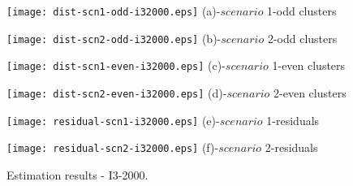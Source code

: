 \begin{figure}
     \begin{minipage}[h]{0.5\linewidth}
        \centering
        \texttt{[image: dist-scn1-odd-i32000.eps]}
				\footnotesize{(a)-$scenario$ 1-odd clusters}
     \end{minipage}
\vspace{3.00mm}
    \begin{minipage}[h]{0.5\linewidth}
       \centering
       \texttt{[image: dist-scn2-odd-i32000.eps]}
			\footnotesize{(b)-$scenario$ 2-odd clusters}
     \end{minipage}
\vspace{3.00mm}
    \begin{minipage}[h]{0.5\linewidth}
       \centering
       \texttt{[image: dist-scn1-even-i32000.eps]}
			\footnotesize{(c)-$scenario$ 1-even clusters}
     \end{minipage}
\vspace{3.00mm}
    \begin{minipage}[h]{0.5\linewidth}
       \centering
       \texttt{[image: dist-scn2-even-i32000.eps]}
			\footnotesize{(d)-$scenario$ 2-even clusters}
     \end{minipage}
\vspace{3.00mm}
    \begin{minipage}[h]{0.5\linewidth}
       \centering
       \texttt{[image: residual-scn1-i32000.eps]}
			\footnotesize{(e)-$scenario$ 1-residuals}
     \end{minipage}
\vspace{3.00mm}
    \begin{minipage}[h]{0.5\linewidth}
       \centering
       \texttt{[image: residual-scn2-i32000.eps]}
			\footnotesize{(f)-$scenario$ 2-residuals}
     \end{minipage}
		\caption{Estimation results - I3-2000.}
\label{fig10}
\end{figure}

